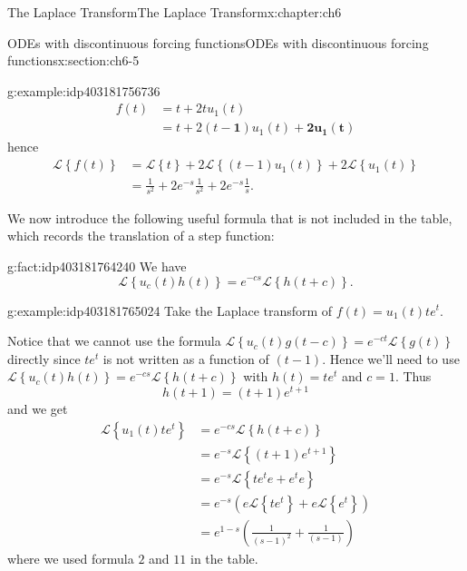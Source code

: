 \documentclass[oneside,10pt,]{book}
\numberwithin{equation}{section}
\numberwithin{equation}{section}
\newcommand{\amp}{&}
\begin{document}
\begin{chapterptx}{The Laplace Transform}{}{The Laplace Transform}{}{}{x:chapter:ch6}
\begin{sectionptx}{ODEs with discontinuous forcing functions}{}{ODEs with discontinuous forcing functions}{}{}{x:section:ch6-5}
\begin{example}{}{g:example:idp403181756736}
\begin{align*}
f(t) \amp =t+2tu_{1}(t)\\
\amp =t+2\left(t-\boldsymbol{1}\right)u_{1}(t)+\boldsymbol{2u_{1}(t)}
\end{align*}
hence%
\begin{align*}
\mathcal{L}\left\{ f(t)\right\}  \amp =\mathcal{L}\left\{ t\right\} +2\mathcal{L}\left\{ (t-1)u_{1}(t)\right\} +2\mathcal{L}\left\{ u_{1}(t)\right\} \\
\amp =\frac{1}{s^{2}}+2e^{-s}\frac{1}{s^{2}}+2e^{-s}\frac{1}{s}.
\end{align*}
%
\end{example}
We now introduce the following useful formula that is not included in the table, which records the translation of a step function:%
\begin{fact}{}{}{g:fact:idp403181764240}%
We have%
\begin{equation*}
\mathcal{L}\left\{ u_{c}(t)h(t)\right\} =e^{-cs}\mathcal{L}\left\{ h\left(t+c\right)\right\} .
\end{equation*}
%
\end{fact}
\begin{example}{}{g:example:idp403181765024}%
Take the Laplace transform of \(f(t)=u_{1}(t)te^{t}\).%
\par
Notice that we cannot use the formula \(\mathcal{L}\left\{ u_{c}(t)g\left(t-c\right)\right\} =e^{-ct}\mathcal{L}\left\{ g(t)\right\} \) directly since \(te^{t}\) is not written as a function of \((t-1)\). Hence we'll need to use \(\mathcal{L}\left\{ u_{c}(t)h(t)\right\} =e^{-cs}\mathcal{L}\left\{ h\left(t+c\right)\right\} \) with \(h(t)=te^{t}\) and \(c=1\). Thus%
\begin{equation*}
h\left(t+1\right)=(t+1)e^{t+1}
\end{equation*}
and we get%
\begin{align*}
\mathcal{L}\left\{ u_{1}(t)te^{t}\right\}  \amp =e^{-cs}\mathcal{L}\left\{ h\left(t+c\right)\right\} \\
\amp =e^{-s}\mathcal{L}\left\{ (t+1)e^{t+1}\right\} \\
\amp =e^{-s}\mathcal{L}\left\{ te^{t}e+e^{t}e\right\} \\
\amp =e^{-s}\left(e\mathcal{L}\left\{ te^{t}\right\} +e\mathcal{L}\left\{ e^{t}\right\} \right)\\
\amp =e^{1-s}\left(\frac{1}{\left(s-1\right)^{2}}+\frac{1}{\left(s-1\right)}\right)
\end{align*}
where we used formula \(2\) and \(11\) in the table.%
\end{example}

\end{sectionptx}
\end{chapterptx}
\end{document}
